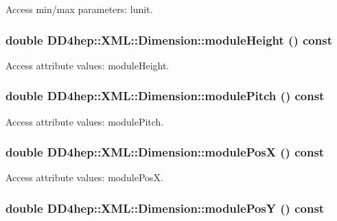 Access min/max parameters: lunit. \hypertarget{struct_d_d4hep_1_1_x_m_l_1_1_dimension_a10482e9c5e93105ea30722b4a3fddea4}{
\subsubsection[{moduleHeight}]{\setlength{\rightskip}{0pt plus 5cm}double DD4hep::XML::Dimension::moduleHeight () const}}
\label{struct_d_d4hep_1_1_x_m_l_1_1_dimension_a10482e9c5e93105ea30722b4a3fddea4}


Access attribute values: moduleHeight. \hypertarget{struct_d_d4hep_1_1_x_m_l_1_1_dimension_acafbea14ea3d6f79405054d3105babba}{
\subsubsection[{modulePitch}]{\setlength{\rightskip}{0pt plus 5cm}double DD4hep::XML::Dimension::modulePitch () const}}
\label{struct_d_d4hep_1_1_x_m_l_1_1_dimension_acafbea14ea3d6f79405054d3105babba}


Access attribute values: modulePitch. \hypertarget{struct_d_d4hep_1_1_x_m_l_1_1_dimension_a9c659e0db8c3ae82c39a27774768acf7}{
\subsubsection[{modulePosX}]{\setlength{\rightskip}{0pt plus 5cm}double DD4hep::XML::Dimension::modulePosX () const}}
\label{struct_d_d4hep_1_1_x_m_l_1_1_dimension_a9c659e0db8c3ae82c39a27774768acf7}


Access attribute values: modulePosX. \hypertarget{struct_d_d4hep_1_1_x_m_l_1_1_dimension_a916a7a7ffeac1b7fa8a60ec0e92d9503}{
\subsubsection[{modulePosY}]{\setlength{\rightskip}{0pt plus 5cm}double DD4hep::XML::Dimension::modulePosY () const}}
\label{struct_d_d4hep_1_1_x_m_l_1_1_dimension_a916a7a7ffeac1b7fa8a60ec0e92d9503}


